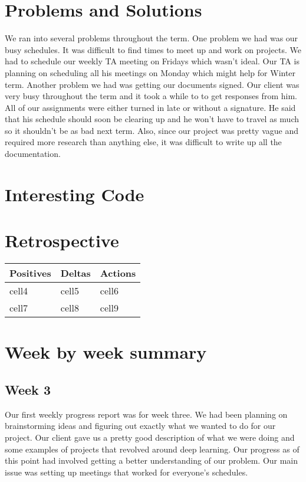 \documentclass[onecolumn, draftclsnofoot,10pt, compsoc]{IEEEtran}
\begin{document}
\section{Problems and Solutions}
We ran into several problems throughout the term.
One problem we had was our busy schedules.
It was difficult to find times to meet up and work on projects.
We had to schedule our weekly TA meeting on Fridays which wasn't ideal.
Our TA is planning on scheduling all his meetings on Monday which might help for Winter term.
Another problem we had was getting our documents signed.
Our client was very busy throughout the term and it took a while to to get responses from him.
All of our assignments were either turned in late or without a signature.
He said that his schedule should soon be clearing up and he won't have to travel as much so it shouldn't be as bad next term.
Also, since our project was pretty vague and required more research than anything else, it was difficult to write up all the documentation.

\section{Interesting Code}
\section{Retrospective}

\begin{center}
\begin{tabu} to 0.9\linewidth{ || X[l] | X[c] | X[r] || } 
	\hline
	Positives & Deltas & Actions \\
	\hline\hline
	cell4 & cell5 & cell6 \\ 
	cell7 & cell8 & cell9 \\ 
	\hline
\end{tabu}
\end{center}

\section{Week by week summary}

\subsection{Week 3}
Our first weekly progress report was for week three.
We had been planning on brainstorming ideas and figuring out exactly what we wanted to do for our project.
Our client gave us a pretty good description of what we were doing and some examples of projects that revolved around deep learning.
Our progress as of this point had involved getting a better understanding of our problem.
Our main issue was setting up meetings that worked for everyone's schedules.
\end{document}
